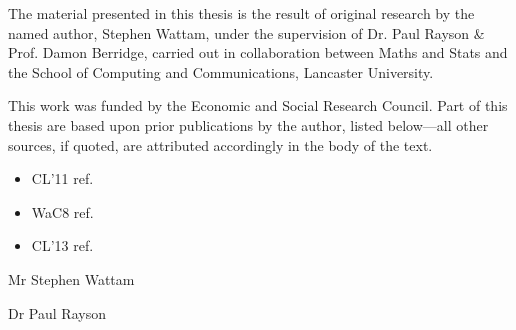 The material presented in this thesis is the result of original research by the named author, Stephen Wattam, under the supervision of Dr. Paul Rayson \& Prof. Damon Berridge, carried out in collaboration between Maths and Stats and the School of Computing and Communications, Lancaster University.

This work was funded by the Economic and Social Research Council.  Part of this thesis are based upon prior publications by the author, listed below---all other sources, if quoted, are attributed accordingly in the body of the text.

\begin{itemize}
    \item CL'11 ref.
    \item WaC8 ref.
    \item CL'13 ref.
\end{itemize}

\vspace{1in}
Mr Stephen Wattam \dotfill


\vspace{0.5in}
Dr Paul Rayson \dotfill






